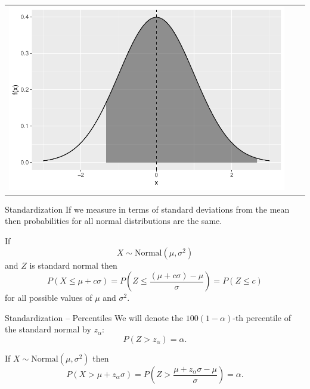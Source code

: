 \begin{frame}
\begin{block}{\examplectd}
\begin{center}
\begin{tabular}{ccc}
    \includegraphics[height = .35\textheight]{figure/exercise-20-8}
    \end{tabular}
    \end{center}
  \end{block}
  
\end{frame}

\begin{frame}
  \begin{block}{Standardization}
    If we measure in terms of standard deviations from the mean then probabilities for all normal distributions are the same.
    
    \bigskip
    
    If 
    $$
    X \sim \mbox{Normal}(\mu,\sigma^2)
    $$
    and $Z$ is standard normal then
    \[
      P(X \leq  \mu + c\sigma) = P\left(Z \leq \frac{(\mu + c\sigma) - \mu}{\sigma}\right)=P(Z \leq c)
    \]
    for all possible values of $\mu$ and $\sigma^2$.
  \end{block}
\end{frame}

\begin{frame}
  \begin{block}{Standardization -- Percentiles}
  We will denote the $100(1-\alpha)$-th percentile of the standard normal by $z_\alpha$:
  $$
  P(Z > z_\alpha)=\alpha.
  $$
  
  \bigskip
  
  If $X \sim \mbox{Normal}(\mu,\sigma^2)$ then
  $$
  P(X > \mu + z_\alpha \sigma)=
  P\left(Z > \frac{\mu + z_\alpha \sigma - \mu}{\sigma}\right)=\alpha.
  $$
  \end{block}
\end{frame}

